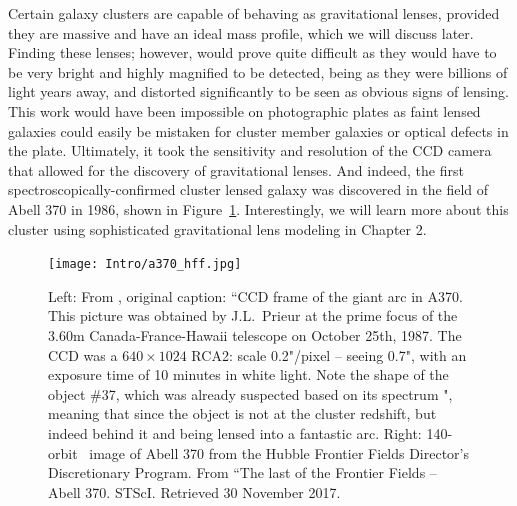 Certain galaxy clusters are capable of behaving as gravitational lenses, provided they are massive and have an ideal mass profile, which we will discuss later. Finding these lenses; however, would prove quite difficult as they would have to be very bright and highly magnified to be detected, being as they were billions of light years away, and distorted significantly to be seen as obvious signs of lensing. This work would have been impossible on photographic plates as faint lensed galaxies could easily be mistaken for cluster member galaxies or optical defects in the plate. Ultimately, it took the sensitivity and resolution of the CCD camera that allowed for the discovery of gravitational lenses. And indeed, the first spectroscopically-confirmed cluster lensed galaxy was discovered in the field of Abell 370 in 1986, shown in Figure~\ref{intro:fig:a370}. Interestingly, we will learn more about this cluster using sophisticated gravitational lens modeling in Chapter 2.

\begin{figure}
\texttt{[image: Intro/a370\_hff.jpg]}
\caption[Images of Abell 370 -- the first cluster lens]{Left: From \citet{Soucail:1988kx}, original caption: ``CCD frame of the giant arc in A370. This picture was obtained by J.L.~Prieur at the prime focus of the 3.60m Canada-France-Hawaii telescope on October 25th, 1987. The CCD was a $640\times1024$ RCA2: scale 0.2"/pixel -- seeing 0.7", with an exposure time of 10 minutes in white light. Note the shape of the object \#37, which was already suspected based on its spectrum \citet{Soucail:1987sf}", meaning that since the object is not at the cluster redshift, but indeed behind it and being lensed into a fantastic arc. Right: 140-orbit \hst\ image of Abell 370 from the Hubble Frontier Fields Director's Discretionary Program. From ``The last of the Frontier Fields -- Abell 370. STScI. Retrieved 30 November 2017.}
\label{intro:fig:a370}
\end{figure}



